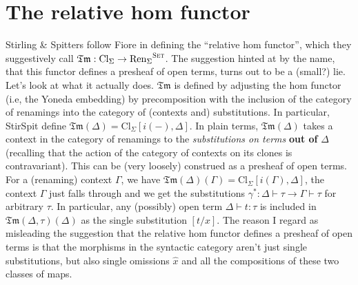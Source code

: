 \documentclass[11pt]{article}
\begin{document}
\section{The relative hom functor}
\label{sec:orgefff5a7}
Stirling \& Spitters follow Fiore in defining the ``relative hom functor'', which
they suggestively call \(\mathfrak{Tm} : \text{Cl}_{\Sigma} \rightarrow
{\text{Ren}_\Sigma}^{\textsc{Set}}\). The suggestion hinted at by the name,
that this functor defines a presheaf of open terms, turns out to be a (small?)
lie. Let's look at what it actually does. \(\mathfrak{Tm}\) is defined by
adjusting the hom functor (i.e, the Yoneda embedding) by precomposition with the
inclusion of the category of renamings into the category of (contexts and)
substitutions. In particular, StirSpit define \(\mathfrak{Tm}(\Delta) =
\text{Cl}_{\Sigma} [i(-), \Delta]\). In plain terms, \(\mathfrak{Tm}(\Delta)\)
takes a context in the category of renamings to the \emph{substitutions on terms}
\textbf{out of} \(\Delta\) (recalling that the action of the category of contexts on
its clones is contravariant). This can be (very loosely) construed as a presheaf
of open terms. For a (renaming) context \(\Gamma\), we have
\(\mathfrak{Tm}(\Delta)(\Gamma) = \text{Cl}_{\Sigma} [i(\Gamma), \Delta]\), the
context \(\Gamma\) just falls through and we get the substitutions \(\gamma^{*} : \Delta \vdash \tau \rightarrow \Gamma \vdash \tau\) for arbitrary
\(\tau\). In particular, any (possibly) open term \(\Delta \vdash t : \tau\)
is included in \(\mathfrak{Tm}(\Delta,\tau)(\Delta)\) as the single
substitution \([t/x]\). The reason I regard as misleading the suggestion that
the relative hom functor defines a presheaf of open terms is that the morphisms
in the syntactic category aren't just single substitutions, but also single
omissions \(\hat{x}\) and all the compositions of these two classes of maps.
\end{document}
